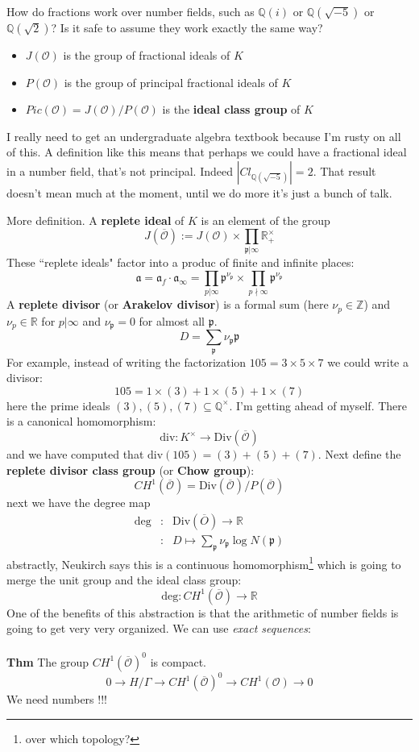 \documentclass[12pt]{article}
\begin{document}
How do fractions work over number fields, such as $\mathbb{Q}(i)$ or $\mathbb{Q}(\sqrt{-5})$ or $\mathbb{Q}(\sqrt{2})$?  Is it safe to assume they work exactly the same way?
\begin{itemize}
\item $J(\mathcal{O})$ is the group of fractional ideals of $K$
\item $P(\mathcal{O})$ is the group of principal fractional ideals of $K$
\item $Pic(\mathcal{O}) =  J(\mathcal{O})/P(\mathcal{O})$ is the \textbf{ideal class group} of $K$
\end{itemize}
I really need to get an undergraduate algebra textbook because I'm rusty on all of this.  A definition like this means that perhaps we could have a fractional ideal in a number field, that's not principal.  Indeed $|Cl_{\mathbb{Q}(\sqrt{-5})}|=2$.  That result doesn't mean much at the moment, until we do more it's just a bunch of talk.

\newpage

\noindent More definition. A \textbf{replete ideal} of $K$ is an element of the group
$$ J(\overline{\mathcal{O}}) := J(\mathcal{O}) \times \prod_{\mathfrak{p}|\infty} \mathbb{R}^\times_+ $$
These ``replete ideals" factor into a produc of finite and infinite places:
$$ \mathfrak{a} = \mathfrak{a}_f \cdot \mathfrak{a}_\infty =  
\prod_{p | \infty} \mathfrak{p}^{\nu_{\mathfrak{p}}} \times \prod_{p \nmid \infty} \mathfrak{p}^{\nu_{\mathfrak{p}}} $$
A \textbf{replete divisor} (or \textbf{Arakelov divisor}) is a formal sum (here $\nu_p \in \mathbb{Z}$) and $\nu_p \in \mathbb{R}$ for $p | \infty$ and $\nu_\mathfrak{p} = 0$ for almost all $\mathfrak{p}$.
$$  D = \sum_{\mathfrak{p}} \nu_{\mathfrak{p}} \mathfrak{p}  $$
For example, instead of writing the factorization $105 = 3 \times 5 \times 7$ we could write a divisor:
$$ 105 = 1 \times (3) + 1 \times (5) + 1 \times (7) $$ 
here the prime ideals $(3), (5) , (7) \subseteq \mathbb{Q}^\times$.  I'm getting ahead of myself.  There is a canonical homomorphism:
$$ \text{div}: K^\times \to \text{Div}(\overline{\mathcal{O}})  $$
and we have computed that $\text{div}(105) = (3) + (5) + (7)$.  Next define the \textbf{replete divisor class group} (or \textbf{Chow group}):
$$ CH^1(\overline{\mathcal{O}}) = \text{Div}(\overline{\mathcal{O}})/P(\overline{\mathcal{O}})$$
next we have the degree map
\begin{eqnarray*}
\text{deg} &:& \text{Div}(\overline{O}) \to \mathbb{R} \\ 
 &:&D \mapsto \sum_\mathfrak{p} \nu_{\mathfrak{p}} \log N(\mathfrak{p}) 
\end{eqnarray*} 
abstractly, Neukirch says this is a continuous homomorphism\footnote{over which topology?} which is going to merge the unit group and the ideal class group:
$$ \text{deg}: CH^1(\overline{\mathcal{O}}) \to \mathbb{R} $$
One of the benefits of this abstraction is that the arithmetic of number fields is going to get very very organized.  We can use \textit{exact sequences}: \\ \\
\textbf{Thm} The group $CH^1(\overline{\mathcal{O}})^0$ is compact.
$$ 0 \to H/\Gamma \to CH^1(\overline{\mathcal{O}})^0 \to CH^1(\mathcal{O}) \to 0 $$
We need numbers !!!
\vfill
\end{document}
